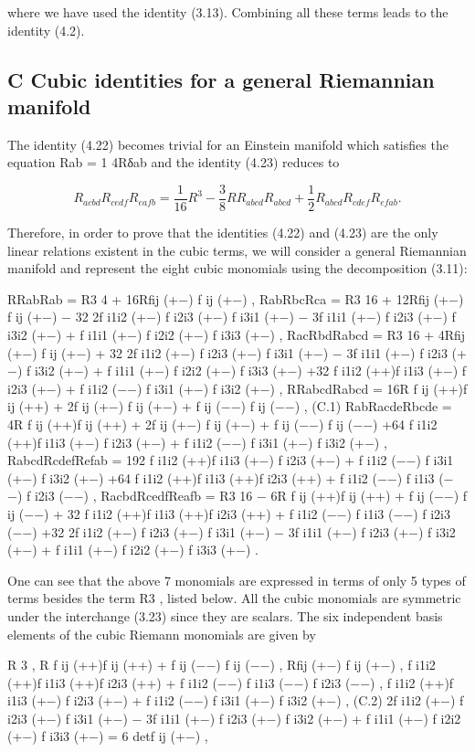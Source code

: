 \documentclass{article}
\begin{document}
where we have used the identity (3.13). Combining all these terms leads to the identity (4.2).

\subsection{C Cubic identities for a general Riemannian manifold}

The identity (4.22) becomes trivial for an Einstein manifold which satisfies the equation Rab = 1 4Rδab and the identity (4.23) reduces to

$$R_{a c b d}R_{c e d f}R_{e a f b}=\frac{1}{16}R^{3}-\frac{3}{8}R R_{a b c d}R_{a b c d}+\frac{1}{2}R_{a b c d}R_{c d e f}R_{e f a b}.$$

Therefore, in order to prove that the identities (4.22) and (4.23) are the only linear relations existent in the cubic terms, we will consider a general Riemannian manifold and represent the eight cubic monomials using the decomposition (3.11):

RRabRab = R3 4 + 16Rfij (+−) f ij (+−) , RabRbcRca = R3 16 + 12Rfij (+−) f ij (+−) − 32 2f i1i2 (+−) f i2i3 (+−) f i3i1 (+−) − 3f i1i1 (+−) f i2i3 (+−) f i3i2 (+−) + f i1i1 (+−) f i2i2 (+−) f i3i3 (+−) , RacRbdRabcd = R3 16 + 4Rfij (+−) f ij (+−) + 32 2f i1i2 (+−) f i2i3 (+−) f i3i1 (+−) − 3f i1i1 (+−) f i2i3 (+−) f i3i2 (+−) + f i1i1 (+−) f i2i2 (+−) f i3i3 (+−) +32 f i1i2 (++)f i1i3 (+−) f i2i3 (+−) + f i1i2 (−−) f i3i1 (+−) f i3i2 (+−) , RRabcdRabcd = 16R f ij (++)f ij (++) + 2f ij (+−) f ij (+−) + f ij (−−) f ij (−−) , (C.1) RabRacdeRbcde = 4R f ij (++)f ij (++) + 2f ij (+−) f ij (+−) + f ij (−−) f ij (−−) +64 f i1i2 (++)f i1i3 (+−) f i2i3 (+−) + f i1i2 (−−) f i3i1 (+−) f i3i2 (+−) , RabcdRcdefRefab = 192 f i1i2 (++)f i1i3 (+−) f i2i3 (+−) + f i1i2 (−−) f i3i1 (+−) f i3i2 (+−) +64 f i1i2 (++)f i1i3 (++)f i2i3 (++) + f i1i2 (−−) f i1i3 (−−) f i2i3 (−−) , RacbdRcedfReafb = R3 16 − 6R f ij (++)f ij (++) + f ij (−−) f ij (−−) + 32 f i1i2 (++)f i1i3 (++)f i2i3 (++) + f i1i2 (−−) f i1i3 (−−) f i2i3 (−−) +32 2f i1i2 (+−) f i2i3 (+−) f i3i1 (+−) − 3f i1i1 (+−) f i2i3 (+−) f i3i2 (+−) + f i1i1 (+−) f i2i2 (+−) f i3i3 (+−) .

One can see that the above 7 monomials are expressed in terms of only 5 types of terms besides the term R3 , listed below. All the cubic monomials are symmetric under the interchange (3.23) since they are scalars. The six independent basis elements of the cubic Riemann monomials are given by

R 3 , R f ij (++)f ij (++) + f ij (−−) f ij (−−) , Rfij (+−) f ij (+−) , f i1i2 (++)f i1i3 (++)f i2i3 (++) + f i1i2 (−−) f i1i3 (−−) f i2i3 (−−) , f i1i2 (++)f i1i3 (+−) f i2i3 (+−) + f i1i2 (−−) f i3i1 (+−) f i3i2 (+−) , (C.2) 2f i1i2 (+−) f i2i3 (+−) f i3i1 (+−) − 3f i1i1 (+−) f i2i3 (+−) f i3i2 (+−) + f i1i1 (+−) f i2i2 (+−) f i3i3 (+−) = 6 detf ij (+−) ,
\end{document}
